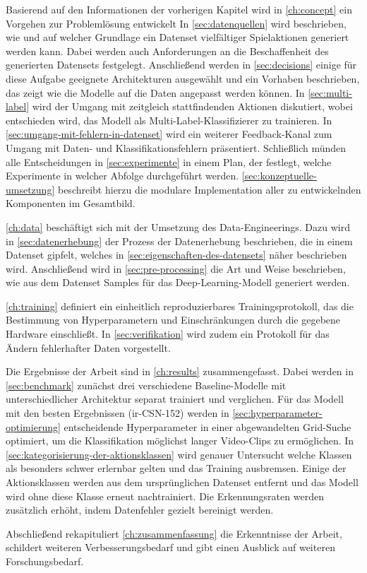 Basierend auf den Informationen der vorherigen Kapitel wird in \autoref{ch:concept} ein Vorgehen zur Problemlösung entwickelt
In \autoref{sec:datenquellen} wird beschrieben, wie und auf welcher Grundlage ein Datenset vielfältiger Spielaktionen generiert werden kann.
Dabei werden auch Anforderungen an die Beschaffenheit des generierten Datensets festgelegt.
Anschließend werden in \autoref{sec:decisions} einige für diese Aufgabe geeignete Architekturen ausgewählt und ein Vorhaben beschrieben, das zeigt wie die Modelle auf die Daten angepasst werden können.
In \autoref{sec:multi-label} wird der Umgang mit zeitgleich stattfindenden Aktionen diskutiert, wobei entschieden wird, das Modell als Multi-Label-Klassifizierer zu trainieren.
In \autoref{sec:umgang-mit-fehlern-in-datenset} wird ein weiterer Feedback-Kanal zum Umgang mit Daten- und Klassifikationsfehlern präsentiert.
Schließlich münden alle Entscheidungen in \autoref{sec:experimente} in einem Plan, der festlegt, welche Experimente in welcher Abfolge durchgeführt werden.
\autoref{sec:konzeptuelle-umsetzung} beschreibt hierzu die modulare Implementation aller zu entwickelnden Komponenten im Gesamtbild.

\autoref{ch:data} beschäftigt sich mit der Umsetzung des Data-Engineerings.
Dazu wird in \autoref{sec:datenerhebung} der Prozess der Datenerhebung beschrieben, die in einem Datenset gipfelt, welches in \autoref{sec:eigenschaften-des-datensets} näher beschrieben wird.
Anschließend wird in \autoref{sec:pre-processing} die Art und Weise beschrieben, wie aus dem Datenset Samples für das Deep-Learning-Modell generiert werden.

\autoref{ch:training} definiert ein einheitlich reproduzierbares Trainingsprotokoll, das die Bestimmung von Hyperparametern und Einschränkungen durch die gegebene Hardware einschließt.
In \autoref{sec:verifikation} wird zudem ein Protokoll für das Ändern fehlerhafter Daten vorgestellt.

Die Ergebnisse der Arbeit sind in \autoref{ch:results} zusammengefasst.
Dabei werden in \autoref{sec:benchmark} zunächst drei verschiedene Baseline-Modelle mit unterschiedlicher Architektur separat trainiert und verglichen.
Für das Modell mit den besten Ergebnissen (ir-CSN-152) werden in \autoref{sec:hyperparameter-optimierung} entscheidende Hyperparameter in einer abgewandelten Grid-Suche optimiert, um die Klassifikation möglichst langer Video-Clips zu ermöglichen.
In \autoref{sec:kategorisierung-der-aktionsklassen} wird genauer Untersucht welche Klassen als besonders schwer erlernbar gelten und das Training ausbremsen.
Einige der Aktionsklassen werden aus dem ursprünglichen Datenset entfernt und das Modell wird ohne diese Klasse erneut nachtrainiert.
Die Erkennungsraten werden zusätzlich erhöht, indem \zB Datenfehler gezielt bereinigt werden.

Abschließend rekapituliert \autoref{ch:zusammenfassung} die Erkenntnisse der Arbeit, schildert weiteren Verbesserungsbedarf und gibt einen Ausblick auf weiteren Forschungsbedarf.
